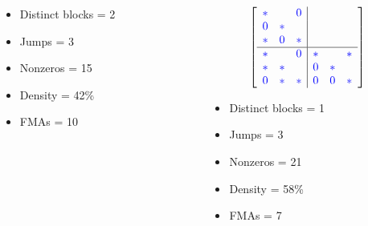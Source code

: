 \documentclass[9pt]{beamer}
\begin{document}
\begin{frame}[fragile]
\begin{columns}[t]
\begin{column}{0.3\textwidth}
        \footnotesize
        \begin{itemize}
          \item Distinct blocks = 2
          \item Jumps = 3
          \item Nonzeros = 15
          \item Density = 42\%
          \item FMAs = 10
        \end{itemize}
    \end{column}
    \begin{column}{0.3\textwidth}
    \[
    \left[
          \begin{array}{ccc|ccc}
          \color{blue}* &   & \color{blue}0 &    &    &    \\
          \color{blue}0 & \color{blue}* &   &    &    &    \\
          \color{blue}* & \color{blue}0 & \color{blue}* &    &    &    \\
          \hline
          \color{blue}* &   & \color{blue}0 & \color{blue}* &   & \color{blue}*  \\
          \color{blue}* & \color{blue}* &   & \color{blue}0 & \color{blue}* &    \\
          \color{blue}0 & \color{blue}* & \color{blue}* & \color{blue}0 & \color{blue}0 & \color{blue}*  \\
          \end{array}
          \right]
      \]
          \footnotesize
          \begin{itemize}
          \item Distinct blocks = 1
          \item Jumps = 3
          \item Nonzeros = 21
          \item Density = 58\%
          \item FMAs = 7
        \end{itemize}
    \end{column}
  \end{columns}

\end{frame}
\end{document}
